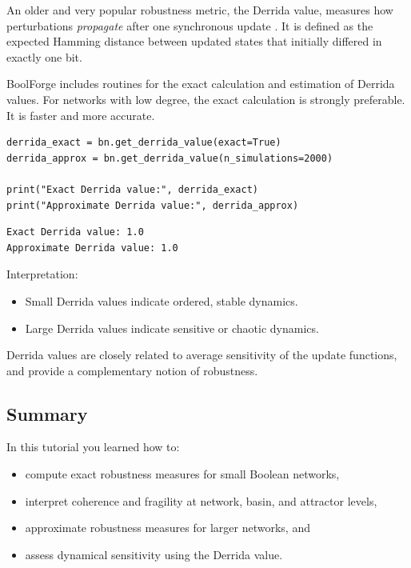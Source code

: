 \documentclass[
]{article}
\providecommand{\tightlist}{%
  \setlength{\itemsep}{0pt}\setlength{\parskip}{0pt}}
\begin{document}
An older and very popular robustness metric, the Derrida value, measures
how perturbations \emph{propagate} after one synchronous update
\citep{derrida1986random}. It is defined as the expected Hamming
distance between updated states that initially differed in exactly one
bit.

BoolForge includes routines for the exact calculation and estimation of
Derrida values. For networks with low degree, the exact calculation is
strongly preferable. It is faster and more accurate.

\begin{lstlisting}
derrida_exact = bn.get_derrida_value(exact=True)
derrida_approx = bn.get_derrida_value(n_simulations=2000)

print("Exact Derrida value:", derrida_exact)
print("Approximate Derrida value:", derrida_approx)
\end{lstlisting}

\begin{lstlisting}
Exact Derrida value: 1.0
Approximate Derrida value: 1.0
\end{lstlisting}

Interpretation:

\begin{itemize}
\tightlist
\item
  Small Derrida values indicate ordered, stable dynamics.
\item
  Large Derrida values indicate sensitive or chaotic dynamics.
\end{itemize}

Derrida values are closely related to average sensitivity of the update
functions, and provide a complementary notion of robustness.

\subsection{Summary}\label{summary-6}

In this tutorial you learned how to:

\begin{itemize}
\tightlist
\item
  compute exact robustness measures for small Boolean networks,
\item
  interpret coherence and fragility at network, basin, and attractor
  levels,
\item
  approximate robustness measures for larger networks, and
\item
  assess dynamical sensitivity using the Derrida value.
\end{itemize}
\end{document}
